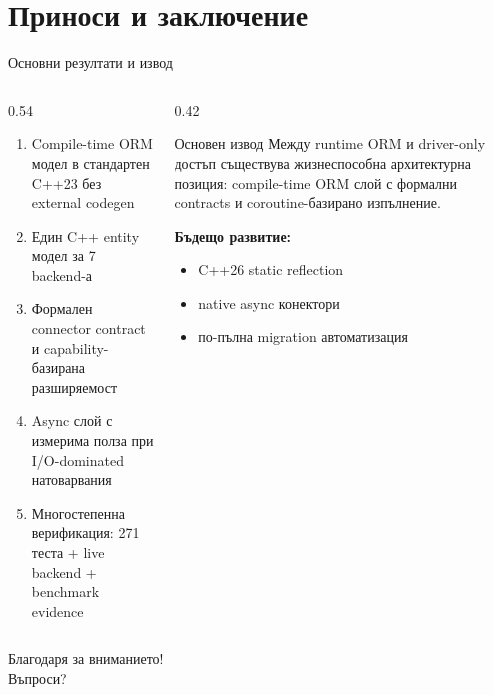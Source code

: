 \documentclass[aspectratio=169,12pt]{beamer}
\begin{document}
\section{Приноси и заключение}

\begin{frame}{Основни резултати и извод}
    \begin{columns}[T]
        \begin{column}{0.54\textwidth}
            \begin{enumerate}\small
                \item Compile-time ORM модел в стандартен C++23 без external codegen
                \item Един C++ entity модел за 7 backend-а
                \item Формален connector contract и capability-базирана разширяемост
                \item Async слой с измерима полза при I/O-dominated натоварвания
                \item Многостепенна верификация: 271 теста + live backend + benchmark evidence
            \end{enumerate}
        \end{column}
        \begin{column}{0.42\textwidth}
            \begin{block}{Основен извод}
                {\small Между runtime ORM и driver-only достъп съществува жизнеспособна архитектурна позиция: compile-time ORM слой с формални contracts и coroutine-базирано изпълнение.}
            \end{block}
            \textbf{Бъдещо развитие:}
            \begin{itemize}\small
                \item C++26 static reflection
                \item native async конектори
                \item по-пълна migration автоматизация
            \end{itemize}
        \end{column}
    \end{columns}
\end{frame}

\begin{frame}[plain]
    \vfill
    \centering
    {\Large\color{tusofia} Благодаря за вниманието!}\\[0.6em]
    {\large Въпроси?}
    \vfill
\end{frame}
\end{document}
